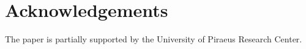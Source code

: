 \section*{Acknowledgements}
The paper is partially supported by the University of Piraeus Research Center.
